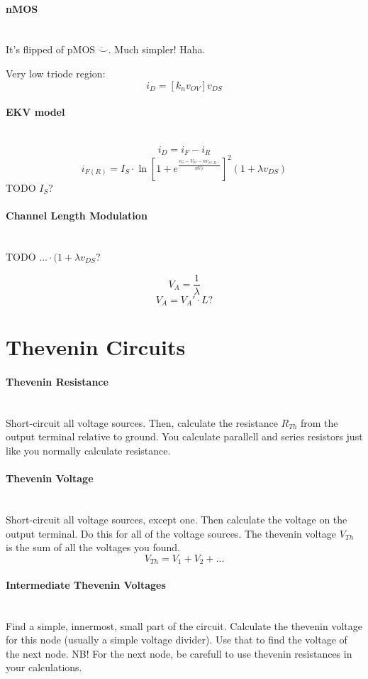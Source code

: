\documentclass[twocolumn]{article}
\begin{document}
    \paragraph{nMOS} \hfill \\
      It's flipped of pMOS $\ddot\smile$. Much simpler! Haha.

      Very low triode region:
        $$i_D = [k_n v_{OV}] v_{DS}$$
    \paragraph{EKV model} \hfill \\
      $$i_D = i_F - i_R$$
      $$i_{F(R)} = I_S \cdot
                   \ln \left[ 1 + e^{\frac{v_G - V_{tn} - nv_{S(D)}}{nV_T}}
                       \right] ^2
                   (1 + \lambda v_{DS})$$
      TODO $I_S$?
    \paragraph{Channel Length Modulation} \hfill \\
      TODO $... \cdot (1 + \lambda v_{DS}$?

      $$V_A = \frac{1}{\lambda}$$
      $$V_A = V_A' \cdot L?$$

  \section{Thevenin Circuits}
    \paragraph{Thevenin Resistance} \hfill \\
      Short-circuit all voltage sources.
      Then, calculate the resistance $R_{Th}$ from the output terminal relative
      to ground.
      You calculate parallell and series resistors just like you normally
     calculate resistance.
    \paragraph{Thevenin Voltage} \hfill \\
      Short-circuit all voltage sources, except one.
      Then calculate the voltage on the output terminal.
      Do this for all of the voltage sources.
      The thevenin voltage $V_{Th}$ is the sum of all the voltages you found.
      $$V_{Th} = V_1 + V_2 + ...$$
    \paragraph{Intermediate Thevenin Voltages} \hfill \\
      Find a simple, innermost, small part of the circuit.
      Calculate the thevenin voltage for this node (usually a simple voltage
      divider).
      Use that to find the voltage of the next node.
      NB! For the next node, be carefull to use thevenin resistances in
      your calculations.
\end{document}
